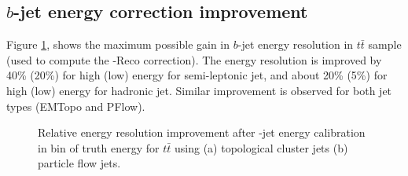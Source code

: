 \subsection{$b$-jet energy correction improvement}
\label{Jet:Cal:BCal:Result}
Figure \ref{fig:Jet:Cal:BCal:Result:E}, shows the maximum possible gain in $b$-jet energy resolution in $t\bar{t}$ sample (used to compute the \pT-Reco correction). The energy resolution is improved by 40\% (20\%) for high (low) energy for semi-leptonic jet, and about 20\% (5\%) for high (low) energy for hadronic jet. Similar improvement is observed for both jet types (EMTopo and PFlow).
\begin{figure}[htbp]
   \centering
   \quad
   \begin{tcolorbox}[colback=black!5!white,colframe=white!75!black]
   \caption{Relative energy resolution improvement after \bq-jet energy calibration in bin of truth energy for $t\bar{t}$ using (a) topological cluster jets (b) particle flow jets.}
    \label{fig:Jet:Cal:BCal:Result:E}
   \end{tcolorbox}
\end{figure}
